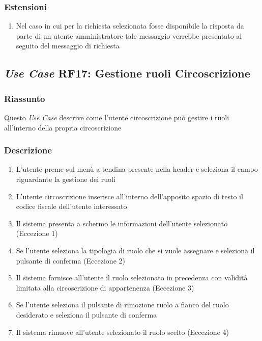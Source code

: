         \subsubsection{Estensioni}
            \begin{enumerate}
                \item Nel caso in cui per la richiesta selezionata fosse disponibile la risposta da parte di un utente amministratore tale messaggio verrebbe presentato al seguito del messaggio di richiesta 
            \end{enumerate}

    \subsection{\textit{Use Case} RF17: Gestione ruoli Circoscrizione}
        \subsubsection{Riassunto}
            Questo \textit{Use Case} descrive come l'utente circoscrizione può gestire i ruoli all'interno della propria circoscrizione
        \subsubsection{Descrizione}
            \begin{enumerate}
                \item L'utente preme sul menù a tendina presente nella header e seleziona il campo riguardante la gestione dei ruoli
                \item L'utente circoscrizione inserisce all'interno dell'apposito spazio di testo il codice fiscale dell'utente interessato
                \item Il sistema presenta a schermo le informazioni dell'utente selezionato (Eccezione 1)
                \item Se l'utente seleziona la tipologia di ruolo che si vuole assegnare e seleziona il pulsante di conferma (Eccezione 2)
                \item Il sistema fornisce all'utente il ruolo selezionato in precedenza con validità limitata alla circoscrizione di appartenenza (Eccezione 3)
                \item Se l'utente seleziona il pulsante di rimozione ruolo a fianco del ruolo desiderato e seleziona il pulsante di conferma
                \item Il sistema rimuove all'utente selezionato il ruolo scelto (Eccezione 4)
            \end{enumerate}

